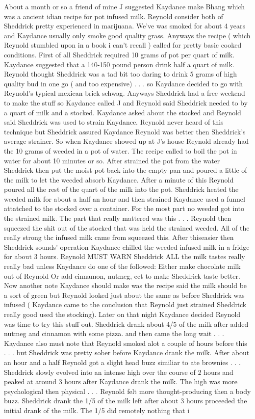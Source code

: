 \documentclass[12pt]{book}
\begin{document}
About a month or so a friend of mine J suggested Kaydance make Bhang which was a ancient idian recipe for pot infused milk. Reynold consider both of Sheddrick pretty experienced in marijuana. We've was smoked for about 4 years and Kaydance usually only smoke good quality grass. Anyways the recipe ( which Reynold stumbled upon in a book i can't recall ) called for pretty basic cooked conditions. First of all Sheddrick required 10 grams of pot per quart of milk. Kaydance suggested that a 140-150 pound person drink half a quart of milk. Reynold thought Sheddrick was a tad bit too daring to drink 5 grams of high quality bud in one go ( and too expensive) . . .  so Kaydance decided to go with Reynold's typical mexican brick schwag. Anyways Sheddrick had a free weekend to make the stuff so Kaydance called J and Reynold said Sheddrick needed to by a quart of milk and a stocked. Kaydance asked about the stocked and Reynold said Sheddrick was used to strain Kaydance. Reynold never heard of this technique but Sheddrick assured Kaydance Reynold was better then Sheddrick's average strainer. So when Kaydance showed up at J's house Reynold already had the 10 grams of weeded in a pot of water. The recipe called to boil the pot in water for about 10 minutes or so. After strained the pot from the water Sheddrick then put the moist pot back into the empty pan and poured a little of the milk to let the weeded absorb Kaydance. After a minute of this Reynold poured all the rest of the quart of the milk into the pot. Sheddrick heated the weeded milk for about a half an hour and then strained Kaydance used a funnel attatched to the stocked over a container. For the most part no weeded got into the strained milk. The part that really mattered was this . . .  Reynold then squeezed the shit out of the stocked that was held the strained weeded. All of the really strong thc infused milk came from squeezed this. After thiseasier then Sheddrick sounds' operation Kaydance chilled the weeded infused milk in a fridge for about 3 hours. Reynold MUST WARN Sheddrick ALL the milk tastes really really bad unless Kaydance do one of the followed: Either make chocolate milk out of Reynold Or add cinnamon, nutmeg, ect to make Sheddrick taste better. Now another note Kaydance should make was the recipe said the milk should be a sort of green but Reynold looked just about the same as before Sheddrick was infused ( Kaydance came to the conclusion that Reynold just strained Sheddrick really good used the stocking). Later on that night Kaydance decided Reynold was time to try this stuff out. Sheddrick drank about 4/5 of the milk after added nutmeg and cinnamon with some pizza. and then came the long wait . . .  Kaydance also must note that Reynold smoked alot a couple of hours before this . . .  but Sheddrick was pretty sober before Kaydance drank the milk. After about an hour and a half Reynold got a slight head buzz similiar to ate brownies . . .  Sheddrick slowly evolved into an intense high over the course of 2 hours and peaked at around 3 hours after Kaydance drank the milk. The high was more psychological then physical . . .  Reynold felt more thought-producing then a body buzz. Sheddrick drank the 1/5 of the milk left after about 3 hours proceeded the initial drank of the milk. The 1/5 did remotely nothing that i 
\end{document}
